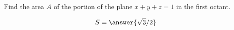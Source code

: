 \documentclass{ximera}
\author{David Guichard \and Neal Koblitz \and H. Jerome Keisler \and Albert Scheller \and Barry Balof \and Mike Wills \and Matthew Carr}
\begin{document}
\begin{exercise}





Find the area $A$ of the portion of the plane $x+y+z=1$ in the first octant.

\begin{prompt}
\[
S=\answer{\sqrt{3}/2}
\]
\end{prompt}



\end{exercise}
\end{document}
